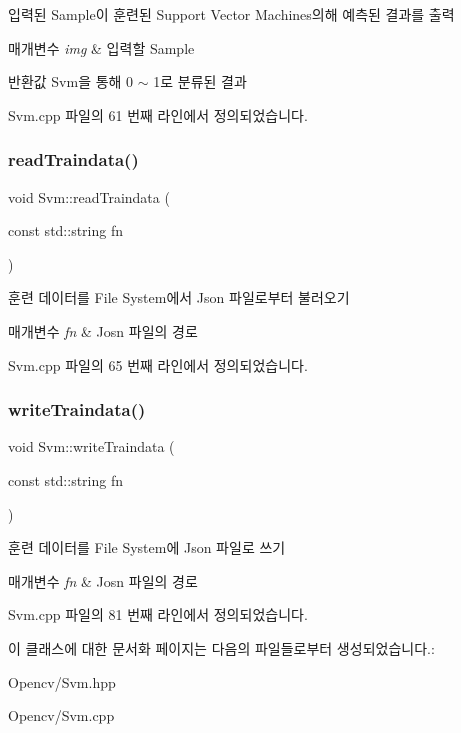 입력된 Sample이 훈련된 Support Vector Machines의해 예측된 결과를 출력 


\begin{DoxyParams}{매개변수}
{\em img} & 입력할 Sample \\
\hline
\end{DoxyParams}
\begin{DoxyReturn}{반환값}
Svm을 통해 0 $\sim$ 1로 분류된 결과 
\end{DoxyReturn}


Svm.\+cpp 파일의 61 번째 라인에서 정의되었습니다.

\mbox{\label{class_svm_afb95b76fa494604abcd022c5948fb728}} 
\subsubsection{\texorpdfstring{read\+Traindata()}{readTraindata()}}
{\footnotesize\ttfamily void Svm\+::read\+Traindata (\begin{DoxyParamCaption}\item[{const std\+::string}]{fn }\end{DoxyParamCaption})\hspace{0.3cm}{\ttfamily [private]}}



훈련 데이터를 File System에서 Json 파일로부터 불러오기 


\begin{DoxyParams}{매개변수}
{\em fn} & Josn 파일의 경로 \\
\hline
\end{DoxyParams}


Svm.\+cpp 파일의 65 번째 라인에서 정의되었습니다.

\mbox{\label{class_svm_a303d7fad50a71154c8201883db777ca1}} 
\subsubsection{\texorpdfstring{write\+Traindata()}{writeTraindata()}}
{\footnotesize\ttfamily void Svm\+::write\+Traindata (\begin{DoxyParamCaption}\item[{const std\+::string}]{fn }\end{DoxyParamCaption})\hspace{0.3cm}{\ttfamily [private]}}



훈련 데이터를 File System에 Json 파일로 쓰기 


\begin{DoxyParams}{매개변수}
{\em fn} & Josn 파일의 경로 \\
\hline
\end{DoxyParams}


Svm.\+cpp 파일의 81 번째 라인에서 정의되었습니다.



이 클래스에 대한 문서화 페이지는 다음의 파일들로부터 생성되었습니다.\+:\begin{DoxyCompactItemize}
\item 
Opencv/Svm.\+hpp\item 
Opencv/Svm.\+cpp\end{DoxyCompactItemize}
